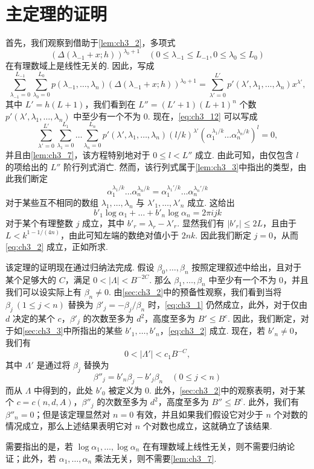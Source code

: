 \section{主定理的证明}

首先，我们观察到借助于\autoref{lem:ch3_2}，多项式
\[
(\Delta(\lambda_{-1}+x; h))^{\lambda_0+1} \quad (0 \le \lambda_{-1} \le L_{-1}, 0 \le \lambda_0 \le L_0)
\]
在有理数域上是线性无关的. 因此，写成
\[
\sum_{\lambda_{-1}=0}^{L_{-1}} \sum_{\lambda_0=0}^{L_0} p(\lambda_{-1}, \dots, \lambda_n) (\Delta(\lambda_{-1}+x; h))^{\lambda_0+1} = \sum_{\lambda'=0}^{L'} p'(\lambda', \lambda_1, \dots, \lambda_n) x^{\lambda'},
\]
其中 $L' = h(L+1)$，我们看到在 $L'' = (L'+1)(L+1)^n$ 个数 $p'(\lambda', \lambda_1, \dots, \lambda_n)$ 中至少有一个不为 $0$. 现在，\eqref{eq:ch3_12} 可以写成
\[
\sum_{\lambda'=0}^{L'} \sum_{\lambda_1=0}^{L_1} \dots \sum_{\lambda_n=0}^{L_n} p'(\lambda', \lambda_1, \dots, \lambda_n) (l/k)^{\lambda'} (\alpha_1^{\lambda_1/k} \dots \alpha_n^{\lambda_n/k})^l = 0,
\]
并且由\autoref{lem:ch3_7}，该方程特别地对于 $0 \le l < L''$ 成立. 由此可知，由仅包含 $l$ 的项给出的 $L''$ 阶行列式消亡. 然而，该行列式属于\autoref{lem:ch3_3}中指出的类型，由此我们断定
\[
\alpha_1^{\lambda_1/k} \dots \alpha_n^{\lambda_n/k} = \alpha_1^{\lambda_1'/k} \dots \alpha_n^{\lambda_n'/k}
\]
对于某些互不相同的数组 $\lambda_1, \dots, \lambda_n$ 与 $\lambda'_1, \dots, \lambda'_n$ 成立. 这给出
\[
b'_1 \log \alpha_1 + \dots + b'_n \log \alpha_n = 2\pi ijk
\]
对于某个有理整数 $j$ 成立，其中 $b'_r = \lambda_r - \lambda'_r$. 显然我们有 $|b'_r| \le 2L$，且由于 $L < k^{1-1/(4n)}$，由此可知左端的数绝对值小于 $2nk$. 因此我们断定 $j = 0$，从而 \eqref{eq:ch3_2} 成立，正如所求.

该定理的证明现在通过归纳法完成. 假设 $\beta_0, \dots, \beta_n$ 按照定理叙述中给出，且对于某个足够大的 $C$，满足 $0 < |\Lambda| < B^{-2C}$. 那么 $\beta_1, \dots, \beta_n$ 中至少有一个不为 $0$，并且我们可以设实际上有 $\beta_n \neq 0$. 由\autoref{sec:ch3_2}中的预备性观察，我们看到当将 $\beta_j \ (1 \le j < n)$ 替换为 $\beta'_j = -\beta_j/\beta_n$ 时，\eqref{eq:ch3_1} 仍然成立，此外，对于仅由 $d$ 决定的某个 $c$，$\beta'_j$ 的次数至多为 $d^2$，高度至多为 $B' \le B^c$. 因此，我们断定，对于如\autoref{sec:ch3_3}中所指出的某些 $b'_1, \dots, b'_n$，\eqref{eq:ch3_2} 成立. 现在，若 $b'_n \neq 0$，我们有
\[
0 < |\Lambda'| < c_1 B^{-C},
\]
其中 $\Lambda'$ 是通过将 $\beta_j$ 替换为
\[
\beta''_j = b'_n \beta_j - b'_j \beta_n \quad (0 \le j < n)
\]
而从 $\Lambda$ 中得到的，此处 $b'_0$ 被定义为 $0$. 此外，\autoref{sec:ch3_2}中的观察表明，对于某个 $c = c(n, d, A)$，$\beta''_j$ 的次数至多为 $d^2$，高度至多为 $B'' \le B^c$. 此外，我们有 $\beta''_n = 0$；但是该定理显然对 $n = 0$ 有效，并且如果我们假设它对少于 $n$ 个对数的情况成立，那么上述结果表明它对 $n$ 个对数也成立，这就确立了该结果.

需要指出的是，若 $\log \alpha_1, \dots, \log \alpha_n$ 在有理数域上线性无关，则不需要归纳论证；此外，若 $\alpha_1, \dots, \alpha_n$ 乘法无关，则不需要\autoref{lem:ch3_7}.
